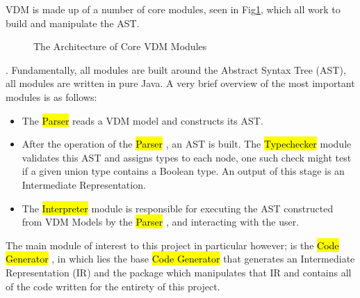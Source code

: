 VDM is made up of a number of core modules, seen in Fig\ref{fig:VDM Modules Architecture}, which all work to build and manipulate the AST.\begin{figure}
        \caption{\label{fig:VDM Modules Architecture} The Architecture of Core VDM Modules \parencite{OvertureWikiArchitectureDescription}}
      \end{figure}.
Fundamentally, all modules are built around the Abstract Syntax Tree (AST), all modules are written in pure Java. A very brief overview of the most important modules is as follows: \begin{itemize}
	\item The \ttfamily\hl{Parser} \rmfamily reads a VDM model and constructs its AST.
	\item After the operation of the \ttfamily\hl{Parser} \rmfamily, an AST is built. The \ttfamily\hl{Typechecker} \rmfamily module validates this AST and assigns types to each node, one such check might test if a given union type contains a Boolean type. An output of this stage is an Intermediate Representation.
	\item The \ttfamily\hl{Interpreter} \rmfamily module is responsible for executing the AST constructed from VDM Models by the \ttfamily\hl{Parser} \rmfamily, and interacting with the user.
	\end{itemize}


The main module of interest to this project in particular however; is the \ttfamily\hl{Code Generator} \rmfamily, in which lies the base \ttfamily\hl{Code Generator} \rmfamily that generates an Intermediate Representation (IR) and the  package which manipulates that IR and contains all of the code written for the entirety of this project.

